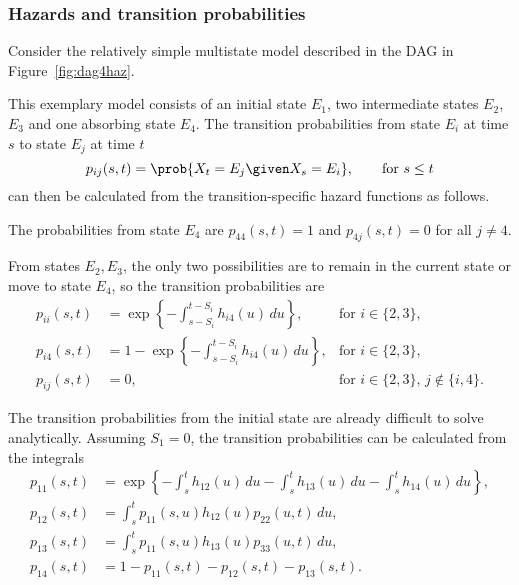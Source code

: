 \subsubsection{Hazards and transition probabilities} \label{sec:hazards}

Consider the relatively simple multistate model described in the DAG in Figure~\ref{fig:dag4haz}.


This exemplary model consists of an initial state $E_1$, two intermediate states $E_2$, $E_3$ and one absorbing state $E_4$. The transition probabilities from state $E_i$ at time $s$ to state $E_j$ at time $t$
\begin{equation} \label{eqn:pij}
	p_{ij}(s,t)=\prob{X_t=E_j \given X_s=E_i}, \hspace{2em} \text{for $s\leq t$}
\end{equation}
can then be calculated from the transition-specific hazard functions as follows. 
 
The probabilities from state $E_4$ are $p_{44}(s,t)=1$ and $p_{4j}(s,t)=0$ for all $j\neq 4$. 

From states $E_2,E_3$, the only two possibilities are to remain in the current state or move to state $E_4$, so the transition probabilities are
\begin{align} \label{eqn:pij_ex23}
	p_{ii}(s,t)&=\exp\left\{-\int_{s-S_i}^{t-S_i} h_{i4}(u) \, du \right\}, &\text{for $i\in\{2,3\}$}, \\
	p_{i4}(s,t)&=1-\exp\left\{-\int_{s-S_i}^{t-S_i} h_{i4}(u) \, du \right\}, &\text{for $i\in\{2,3\}$}, \\
	p_{ij}(s,t)&=0, &\text{for $i\in\{2,3\}$, $j\not\in\{i,4\}$}.
\end{align}

The transition probabilities from the initial state are already difficult to solve analytically. Assuming $S_1=0$, the transition probabilities can be calculated from the integrals
\begin{align} \label{eqn:pij_ex1}
	p_{11}(s,t)&=\exp\left\{-\int_s^t h_{12}(u)\,du -\int_s^t h_{13}(u) \, du -\int_s^t h_{14}(u) \, du\right\}, \\
	p_{12}(s,t)&=\int_s^t p_{11}(s,u)h_{12}(u)p_{22}(u,t) \, du, \\
	p_{13}(s,t)&=\int_s^t p_{11}(s,u)h_{13}(u)p_{33}(u,t) \, du, \\
	p_{14}(s,t)&=1-p_{11}(s,t)-p_{12}(s,t)-p_{13}(s,t) .%
\end{align}

